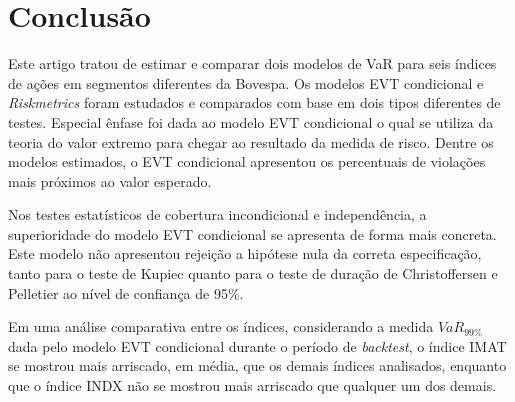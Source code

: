 \documentclass[1p]{elsarticle}
\theoremstyle{definition}
\begin{document}
\section{Conclusão}

Este artigo tratou de estimar e comparar dois modelos de VaR para seis índices de ações em segmentos diferentes da Bovespa. Os modelos EVT condicional e \emph{Riskmetrics} foram estudados e comparados com base em dois tipos diferentes de testes. Especial ênfase foi dada ao modelo EVT condicional o qual se utiliza da teoria do valor extremo para chegar ao resultado da medida de risco. Dentre os modelos estimados, o EVT condicional apresentou os percentuais de violações mais próximos ao valor esperado.

Nos testes estatísticos de cobertura incondicional e independência, a superioridade do modelo EVT condicional se apresenta de forma mais concreta. Este modelo não apresentou rejeição a hipótese nula da correta especificação, tanto para o teste de Kupiec quanto para o teste de duração de Christoffersen e Pelletier ao nível de confiança de 95\%. 

Em uma análise comparativa entre os índices, considerando a medida $VaR_{99\%}$ dada pelo modelo EVT condicional durante o período de \emph{backtest}, o índice IMAT se mostrou mais arriscado, em média, que os demais índices analisados, enquanto que o índice INDX não se mostrou mais arriscado que qualquer um  dos demais.


\end{document}
